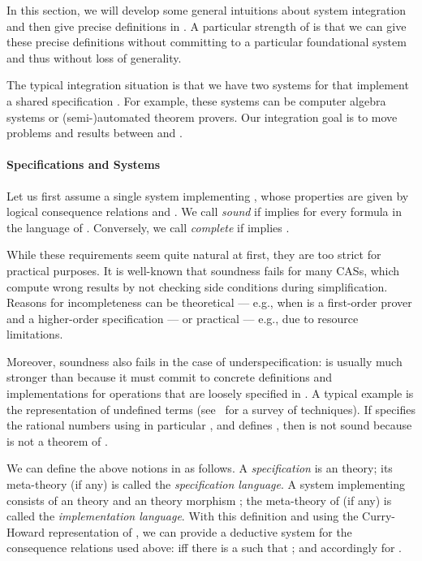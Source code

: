 
In this section, we will develop some general intuitions about system integration and then
give precise definitions in {\MMT}. A particular strength of {\MMT} is that we can give
these precise definitions without committing to a particular foundational system and thus
without loss of generality.

The typical integration situation is that we have two systems  for  that
implement a shared specification . For example, these systems can be computer algebra
systems or (semi-)automated theorem provers. Our integration goal is to move problems and
results between  and .



\paragraph{Specifications and Systems}
Let us first assume a single system  implementing , whose properties are
given by logical consequence relations  and . We call
 \emph{sound} if  implies  for every formula 
in the language of . Conversely, we call  \emph{complete} if  implies .

While these requirements seem quite natural at first, they are too strict for practical purposes. It is well-known that soundness fails for many CASs, which compute wrong results by not checking side conditions during simplification. Reasons for incompleteness can be theoretical --- e.g., when  is a first-order prover and  a higher-order specification --- or practical --- e.g., due to resource limitations.

Moreover, soundness also fails in the case of underspecification:  is usually much
stronger than  because it must commit to concrete definitions and implementations
for operations that are loosely specified in . A typical example is the
representation of undefined terms (see~\cite{DBLP:conf/cade/Farmer04} for a survey of
techniques). If  specifies the rational numbers using in particular , and  defines , then  is not sound because
 is not a theorem of . 




We can define the above notions in {\MMT} as follows. A \emph{specification}  is an
{\MMT} theory; its meta-theory (if any) is called the \emph{specification language}. A
system implementing  consists of an {\MMT} theory  and an {\MMT} theory
morphism ; the meta-theory of  (if any) is called the
\emph{implementation language}.  With this definition and using the Curry-Howard
representation of {\MMT}, we can provide a deductive system for the consequence relations used above:
 iff there is a  such that ; and accordingly for
.

